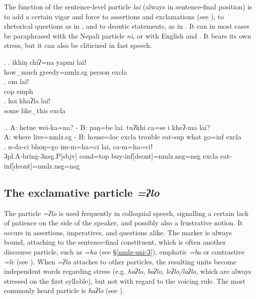 The  function of the sentence-level particle \emph{lai} (always in sentence-final position) is to add a certain vigor and force to assertions and exclamations (see \Next), to rhetorical questions as in \NNext[a], and to deontic statements, as in \NNext[b]. It can in most cases be paraphrased with the Nepali particle \emph{ni}, or with English  and . It bears its own stress, but it can also be cliticized in fast speech. 
  
 \ex. \ag. ikhiŋ chiʔ=na yapmi laiǃ \\
 		how\_much greedy{\sc =nmlz.sg} person {\sc excla}\\
 	\bg. om lai!\\
 	{\sc cop} {\sc emph}\\
	  \bg. koi  khaʔla lai!\\
   		some like\_this {\sc excla}\\
	
 	\ex.\ag. A: hetne wei-ka=na?   - B: paŋ=be lai. tuʔkhi ca=se   i    kheʔ-ma lai?\\
 		A: where live{=nmlz.sg} - B: house{\sc =loc} {\sc excla} trouble eat{\sc -sup}  what go{\sc =inf} {\sc excla}\\
 	\bg. n-da-ci bhoŋ=go     im-m=ha=ci lai,  ca-m=ha=ciǃ\\
 			{\sc 3pl.A-}bring{\sc -3nsg.P[sbjv]} {\sc cond=top} buy{\sc -inf[deont]=nmlz.nsg=nsg} {\sc excla} eat{\sc -inf[deont]=nmlz.nsg=nsg}\\
 	 
	

\subsection{The exclamative particle \emph{=ʔlo}}
 
 The particle \emph{=ʔlo} is used frequently in colloquial speech, signalling a certain lack of patience on the side of the speaker, and possibly also a frustrative notion. It occurs in assertions, imperatives, and questions alike. The marker is always bound, attaching to the sentence-final constituent, which is often another discourse particle, such as \emph{=ha} (see  §\ref{nmlz-uni-3}), emphatic \emph{=ba} or contrastive \emph{=le} (see \Next). When \emph{=ʔlo} attaches to other particles, the resulting units become independent words regarding  stress (e.g. \emph{haʔlo}, \emph{baʔlo}, \emph{leʔlo/laʔlo}, which are always stressed on the first syllable), but not with regard to the voicing rule. The most commonly heard particle is \emph{haʔlo} (see \Next[b]).

